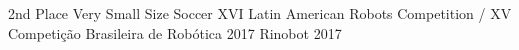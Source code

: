 
\begin{cvhonors}

  \cvhonor
    {2nd Place Very Small Size Soccer } %
    {XVI Latin American Robots Competition / XV Competição Brasileira de Robótica 2017} %
    {Rinobot} %
    {2017} %

\end{cvhonors}